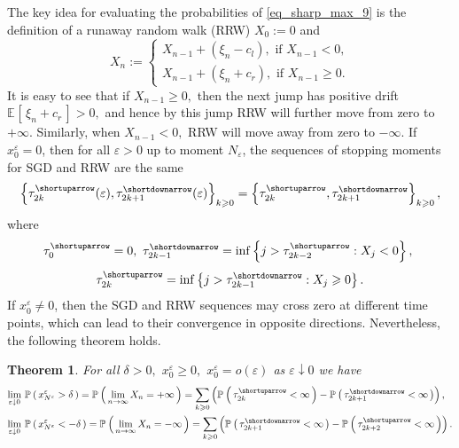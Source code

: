 \documentclass{article}
\theoremstyle{plain}
\newtheorem{theorem}{Theorem}[section]
\theoremstyle{definition}
\theoremstyle{remark}
\newcommand{\p}[2][]{{\mathbb{P}}_{#1} \left( \, #2 \, \right) } %
\newcommand{\e}[2][]{{\mathbb{E}_{#1}\left[ \, #2 \,\right] }} %
\newcommand{\ra }{ \rightarrow} %
\newcommand{\skk}[1]{\left\{ #1 \right\}} %
\begin{document}
The key idea for evaluating the probabilities of \eqref{eq_sharp_max_9} is the definition of a runaway random walk (RRW) $X_0 := 0$ and 
\begin{equation}\label{eq_RRW}
X_n:=\left\{\begin{array}{l}
X_{n-1} + (\xi_n - c_l), \text{ if }  X_{n-1} < 0, \\
X_{n-1} + (\xi_n + c_r), \text{ if }  X_{n-1} \geqslant 0.
\end{array}\right.
\end{equation}
It is easy to see that if $X_{n-1} \geqslant 0,$ then the next jump has positive drift $\e{\xi_n + c_r} > 0,$ and hence by this jump RRW will  further move from zero to $+\infty$. Similarly, when $X_{n-1} <0,$ RRW will move away from zero to $-\infty.$
If $x_0^{\varepsilon} = 0$, then for all $\varepsilon>0$ up to moment $N_\varepsilon$, the sequences of stopping moments for SGD and RRW are the same 
\begin{equation*}
\skk{\tau_{2 k}^{\shortuparrow}(\varepsilon), \tau_{2 k+1}^{\shortdownarrow}(\varepsilon)}_{k \geqslant 0} = \skk{\tau_{2 k}^{\shortuparrow}, \tau_{2 k+1}^{\shortdownarrow}}_{k \geqslant 0},
\end{equation*}
where
\[
    \tau_0^{\shortuparrow}=0, \ 
    \tau_{2 k-1}^{\shortdownarrow}=\inf \left\{j>\tau_{2k-2}^{\shortuparrow}: X_j<0\right\}, \ 
\]
\[
    \tau_{2 k}^{\shortuparrow}=\inf \left\{j>\tau_{2 k-1}^{\shortdownarrow}: X_j \geqslant 0\right\}.
\]
If $x_0^{\varepsilon} \neq 0$, then the SGD and RRW sequences may cross zero at different time points, which can lead to their convergence in opposite directions. Nevertheless, the following theorem holds.
\begin{theorem}\label{th_sharp_max} For all $\delta >0 ,$  $x_{0}^{\varepsilon}\geqslant 0,$ $x_{0}^{\varepsilon} = o(\varepsilon)$ as $\varepsilon\downarrow 0$ we have
\begin{equation}\label{eq_sharp_max_4}
\begin{split}
\lim\limits_{\varepsilon\downarrow 0 } &\ \p{x_{N^{\varepsilon}}^{\varepsilon} > \delta}   = \p{ \lim\limits_{n \ra \infty} X_n  = + \infty} = \sum_{k \geqslant 0} \left( \p{  \tau_{2 k}^{\shortuparrow} < \infty} -\p{\tau_{2 k +1}^{\shortdownarrow} <\infty}\right), \\ 
\lim\limits_{\varepsilon\downarrow 0 } &\ \p{x_{N^{\varepsilon}}^{\varepsilon} < -\delta}  = \p{ \lim\limits_{n \ra \infty} X_n  = - \infty}  = \sum_{k \geqslant 0} \left( \p{  \tau_{2 k+1}^{\shortdownarrow} < \infty} -\p{\tau_{2 k +2}^{\shortuparrow} <\infty}\right). \\ 
\end{split}
\end{equation}
\end{theorem}
\end{document}
